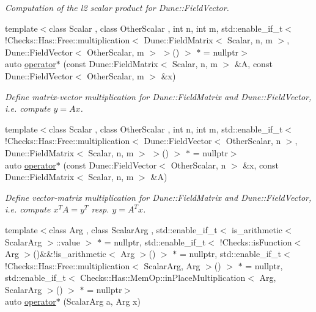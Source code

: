 \begin{DoxyCompactItemize}
\begin{DoxyCompactList}\small\item\em Computation of the l2 scalar product for Dune\-::\-Field\-Vector. \end{DoxyCompactList}\item 
{\footnotesize template$<$class Scalar , class Other\-Scalar , int n, int m, std\-::enable\-\_\-if\-\_\-t$<$ !\-Checks\-::\-Has\-::\-Free\-::multiplication$<$ Dune\-::\-Field\-Matrix$<$ Scalar, n, m $>$, Dune\-::\-Field\-Vector$<$ Other\-Scalar, m $>$ $>$() $>$ $\ast$  = nullptr$>$ }\\auto \hyperlink{namespaceFunG_abadb8da34a5abc3dde0107231ab91c6f}{operator$\ast$} (const Dune\-::\-Field\-Matrix$<$ Scalar, n, m $>$ \&A, const Dune\-::\-Field\-Vector$<$ Other\-Scalar, m $>$ \&x)
\begin{DoxyCompactList}\small\item\em Define matrix-\/vector multiplication for Dune\-::\-Field\-Matrix and Dune\-::\-Field\-Vector, i.\-e. compute $y=Ax$. \end{DoxyCompactList}\item 
{\footnotesize template$<$class Scalar , class Other\-Scalar , int n, int m, std\-::enable\-\_\-if\-\_\-t$<$ !\-Checks\-::\-Has\-::\-Free\-::multiplication$<$ Dune\-::\-Field\-Vector$<$ Other\-Scalar, n $>$, Dune\-::\-Field\-Matrix$<$ Scalar, n, m $>$ $>$() $>$ $\ast$  = nullptr$>$ }\\auto \hyperlink{namespaceFunG_a19a9d7b55b56f5101560034413a1dbfe}{operator$\ast$} (const Dune\-::\-Field\-Vector$<$ Other\-Scalar, n $>$ \&x, const Dune\-::\-Field\-Matrix$<$ Scalar, n, m $>$ \&A)
\begin{DoxyCompactList}\small\item\em Define vector-\/matrix multiplication for Dune\-::\-Field\-Matrix and Dune\-::\-Field\-Vector, i.\-e. compute $x^T A = y^T$ resp. $y=A^T x$. \end{DoxyCompactList}\item 
{\footnotesize template$<$class Arg , class Scalar\-Arg , std\-::enable\-\_\-if\-\_\-t$<$ is\-\_\-arithmetic$<$ Scalar\-Arg $>$\-::value $>$ $\ast$  = nullptr, std\-::enable\-\_\-if\-\_\-t$<$ !\-Checks\-::is\-Function$<$ Arg $>$()\&\&!is\-\_\-arithmetic$<$ Arg $>$() $>$ $\ast$  = nullptr, std\-::enable\-\_\-if\-\_\-t$<$ !\-Checks\-::\-Has\-::\-Free\-::multiplication$<$ Scalar\-Arg, Arg $>$() $>$ $\ast$  = nullptr, std\-::enable\-\_\-if\-\_\-t$<$ Checks\-::\-Has\-::\-Mem\-Op\-::in\-Place\-Multiplication$<$ Arg, Scalar\-Arg $>$() $>$ $\ast$  = nullptr$>$ }\\auto \hyperlink{namespaceFunG_ac71b238827eda3b6518c39e49447bdeb}{operator$\ast$} (Scalar\-Arg a, Arg x)

\end{DoxyCompactItemize}
